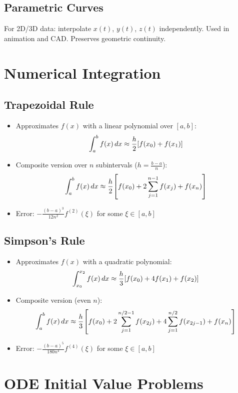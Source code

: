 \documentclass[8pt, letterpaper]{extarticle}
\begin{document}
\begin{multicols*}{3}
  \subsection{Parametric Curves}
  For 2D/3D data: interpolate $x(t)$, $y(t)$, $z(t)$ independently.
  Used in animation and CAD. Preserves geometric continuity.

  \section{Numerical Integration}

  \subsection{Trapezoidal Rule}
  \begin{itemize}
    \item Approximates $f(x)$ with a linear polynomial over $[a,b]$:
      \[
        \int_a^b f(x)\,dx \approx \frac{h}{2} \qty[f(x_0) + f(x_1)]
      \]
    \item Composite version over $n$ subintervals ($h = \frac{b-a}{n}$):
      \[
        \int_a^b f(x)\,dx \approx \frac{h}{2} \qty[f(x_0) + 2 \sum_{j=1}^{n-1} f(x_j) + f(x_n)]
      \]
    \item Error: $-\frac{(b-a)^3}{12n^2}f^{(2)}(\xi)$ for some $\xi \in [a,b]$
  \end{itemize}

  \subsection{Simpson's Rule}
  \begin{itemize}
    \item Approximates $f(x)$ with a quadratic polynomial:
      \[
        \int_{x_0}^{x_2} f(x)\,dx \approx \frac{h}{3} \qty[f(x_0) + 4f(x_1) + f(x_2)]
      \]
    \item Composite version (even $n$):
      \[
        \int_a^b f(x)\,dx \approx \frac{h}{3} \qty[
        f(x_0) +
        2\sum_{j=1}^{n/2 - 1} f(x_{2j}) +
        4\sum_{j=1}^{n/2} f(x_{2j - 1}) +
        f(x_n)
        ]
      \]
    \item Error: $-\frac{(b-a)^5}{180n^4}f^{(4)}(\xi)$ for some $\xi \in [a,b]$
  \end{itemize}

  \section{ODE Initial Value Problems}


\end{multicols*}
\end{document}
